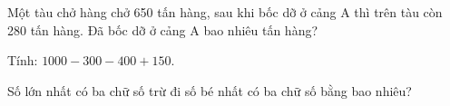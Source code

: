 \begin{ex}
Một tàu chở hàng chở 650 tấn hàng, sau khi bốc dỡ ở cảng A thì trên tàu còn 280 tấn hàng. Đã bốc dỡ ở cảng A bao nhiêu tấn hàng?
\end{ex}

\begin{ex}
Tính: $1000 - 300 - 400 + 150$.
\end{ex}

\begin{ex}
Số lớn nhất có ba chữ số trừ đi số bé nhất có ba chữ số bằng bao nhiêu?
\end{ex}

